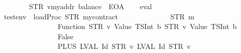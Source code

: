 \begin{isabellebody}
\ \ \ \ \ \ \ {\isacharequal}{\kern0pt}\ STR\ {\isacharprime}{\kern0pt}{\isacharprime}{\kern0pt}v{}{\isacharequal}{\kern0pt}{\isacharequal}{\kern0pt}{}{\isasymnewline}myaddr{\isacharcolon}{\kern0pt}\ balance{\isacharequal}{\kern0pt}{\isacharequal}{\kern0pt}{}{}{}\ {\isacharminus}{\kern0pt}\ EOA{\isacharprime}{\kern0pt}{\isacharprime}{\kern0pt}{\isachardoublequoteclose}\isanewline
%
\isadelimproof
\ \ %
\endisadelimproof
%
\isatagproof
{}\isamarkupfalse%
\ {\isacharparenleft}{\kern0pt}eval{\isacharparenright}{\kern0pt}%
\endisatagproof
{\isafoldproof}%
%
\isadelimproof
\isanewline
%
\endisadelimproof
\isanewline
{}\isamarkupfalse%
\ {\isachardoublequoteopen}testenv{}\ {\isasymequiv}\ loadProc\ {\isacharparenleft}{\kern0pt}STR\ {\isacharprime}{\kern0pt}{\isacharprime}{\kern0pt}mycontract{\isacharprime}{\kern0pt}{\isacharprime}{\kern0pt}{\isacharparenright}{\kern0pt}\isanewline
\ \ \ \ \ \ \ \ \ \ \ \ \ \ {\isacharparenleft}{\kern0pt}{\isacharbrackleft}{\kern0pt}{\isacharparenleft}{\kern0pt}STR\ {\isacharprime}{\kern0pt}{\isacharprime}{\kern0pt}m{}{\isacharprime}{\kern0pt}{\isacharprime}{\kern0pt}{\isacharcomma}{\kern0pt}\isanewline
\ \ \ \ \ \ \ \ \ \ \ \ \ \ \ \ Function\ {\isacharparenleft}{\kern0pt}{\isacharbrackleft}{\kern0pt}{\isacharparenleft}{\kern0pt}STR\ {\isacharprime}{\kern0pt}{\isacharprime}{\kern0pt}v{}{\isacharprime}{\kern0pt}{\isacharprime}{\kern0pt}{\isacharcomma}{\kern0pt}\ Value\ {\isacharparenleft}{\kern0pt}TSInt\ b{}{\isacharparenright}{\kern0pt}{\isacharparenright}{\kern0pt}{\isacharcomma}{\kern0pt}\ {\isacharparenleft}{\kern0pt}STR\ {\isacharprime}{\kern0pt}{\isacharprime}{\kern0pt}v{}{\isacharprime}{\kern0pt}{\isacharprime}{\kern0pt}{\isacharcomma}{\kern0pt}\ Value\ {\isacharparenleft}{\kern0pt}TSInt\ b{}{\isacharparenright}{\kern0pt}{\isacharparenright}{\kern0pt}{\isacharbrackright}{\kern0pt}{\isacharcomma}{\kern0pt}\isanewline
\ \ \ \ \ \ \ \ \ \ \ \ \ \ \ \ False{\isacharcomma}{\kern0pt}\isanewline
\ \ \ \ \ \ \ \ \ \ \ \ \ \ \ \ PLUS\ {\isacharparenleft}{\kern0pt}LVAL\ {\isacharparenleft}{\kern0pt}Id\ {\isacharparenleft}{\kern0pt}STR\ {\isacharprime}{\kern0pt}{\isacharprime}{\kern0pt}v{}{\isacharprime}{\kern0pt}{\isacharprime}{\kern0pt}{\isacharparenright}{\kern0pt}{\isacharparenright}{\kern0pt}{\isacharparenright}{\kern0pt}\ {\isacharparenleft}{\kern0pt}LVAL\ {\isacharparenleft}{\kern0pt}Id\ {\isacharparenleft}{\kern0pt}STR\ {\isacharprime}{\kern0pt}{\isacharprime}{\kern0pt}v{}{\isacharprime}{\kern0pt}{\isacharprime}{\kern0pt}{\isacharparenright}{\kern0pt}{\isacharparenright}{\kern0pt}{\isacharparenright}{\kern0pt}{\isacharparenright}{\kern0pt}{\isacharparenright}{\kern0pt}{\isacharbrackright}{\kern0pt}{\isacharcomma}{\kern0pt}\isanewline

\end{isabellebody}
